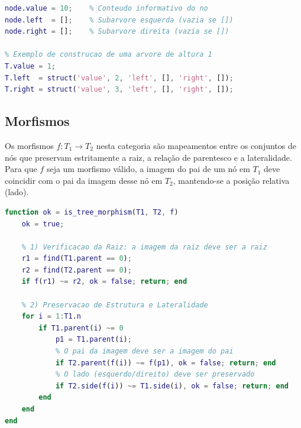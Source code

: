 \begin{lstlisting}[language=Matlab, caption={Representação Recursiva de uma Árvore Binária}]
% Definicao de um no com subarvores
node.value = 10;    % Conteudo informativo do no
node.left  = [];    % Subarvore esquerda (vazia se [])
node.right = [];    % Subarvore direita (vazia se [])

% Exemplo de construcao de uma arvore de altura 1
T.value = 1;
T.left  = struct('value', 2, 'left', [], 'right', []);
T.right = struct('value', 3, 'left', [], 'right', []);
\end{lstlisting}

\subsection{Morfismos}
Os morfismos $f: T_1 \to T_2$ nesta categoria são mapeamentos entre os conjuntos de nós que preservam estritamente a raiz, a relação de parentesco e a lateralidade. Para que $f$ seja um morfismo válido, a imagem do pai de um nó em $T_1$ deve coincidir com o pai da imagem desse nó em $T_2$, mantendo-se a posição relativa (lado).

\begin{lstlisting}[language=Matlab, caption={Algoritmo de Verificação de Morfismo de Árvores}]
function ok = is_tree_morphism(T1, T2, f)
    ok = true;
    
    % 1) Verificacao da Raiz: a imagem da raiz deve ser a raiz
    r1 = find(T1.parent == 0);
    r2 = find(T2.parent == 0);
    if f(r1) ~= r2, ok = false; return; end
    
    % 2) Preservacao de Estrutura e Lateralidade
    for i = 1:T1.n
        if T1.parent(i) ~= 0
            p1 = T1.parent(i);
            % O pai da imagem deve ser a imagem do pai
            if T2.parent(f(i)) ~= f(p1), ok = false; return; end
            % O lado (esquerdo/direito) deve ser preservado
            if T2.side(f(i)) ~= T1.side(i), ok = false; return; end
        end
    end
end
\end{lstlisting}